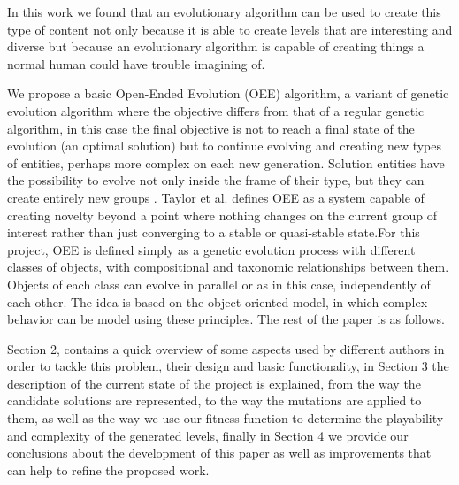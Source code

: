 \documentclass[conference]{IEEEtran}
\begin{document}
    In this work we found that an evolutionary algorithm can be used to create 
    this type of content not only because it is able to create levels that are interesting 
    and diverse but because an evolutionary algorithm is capable of creating things a 
    normal human could have trouble imagining of.
    
    
    
    We propose a basic Open-Ended Evolution (OEE) algorithm, a variant of genetic
    evolution algorithm where the objective differs from that of a regular genetic
    algorithm,  in this case the final objective is not to reach a final state of
    the evolution (an optimal solution) but to continue evolving and creating new
    types of entities, perhaps more complex on each new generation. Solution
    entities have the possibility to evolve not only inside the frame of their type,
    but  they can create entirely new groups \cite{Standish2003}. Taylor et al.
    \cite{Taylor2016,Taylor} defines OEE as a system capable of creating novelty
    beyond a point where nothing changes on the current group of interest rather
    than just converging to a stable or quasi-stable state.For this project, OEE is
    defined simply as a genetic evolution process with different classes of objects,
    with compositional and taxonomic relationships between them. Objects of each
    class can evolve in parallel or as in this case, independently of each other. The
    idea is based on the object oriented model, in which complex behavior can be
    model using these principles. The rest of the paper is as follows.
    
    
    Section 2, contains a quick overview of some aspects used by different authors
    in order to tackle this problem, their design and basic functionality, in
    Section 3 the description of the current state of the project is explained, from
    the way the candidate solutions are represented, to the way the mutations are applied 
    to them, as well as the way we use our fitness function to determine the playability
    and complexity of the generated levels, 
    finally in Section 4 we provide our conclusions about the development of this
    paper as well as improvements that can help to refine the proposed work. 
\end{document}
